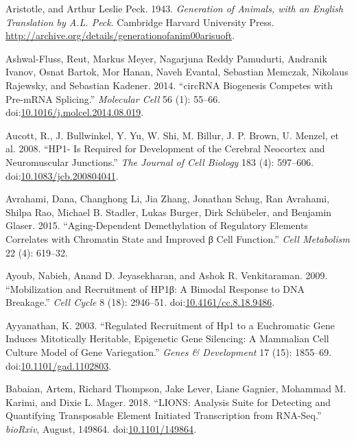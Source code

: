 \documentclass[onehalf,12pt]{beavtex}
\begin{document}
  \hypertarget{ref-AristotleGenerationanimalsEnglish1943}{}
  Aristotle, and Arthur Leslie Peck. 1943. \emph{Generation of Animals,
  with an English Translation by A.L. Peck}. Cambridge Harvard University
  Press. \url{http://archive.org/details/generationofanim00arisuoft}.
  
  \hypertarget{ref-Ashwal-FlusscircRNABiogenesisCompetes2014}{}
  Ashwal-Fluss, Reut, Markus Meyer, Nagarjuna Reddy Pamudurti, Andranik
  Ivanov, Osnat Bartok, Mor Hanan, Naveh Evantal, Sebastian Memczak,
  Nikolaus Rajewsky, and Sebastian Kadener. 2014. ``circRNA Biogenesis
  Competes with Pre-mRNA Splicing.'' \emph{Molecular Cell} 56 (1): 55--66.
  doi:\href{https://doi.org/10.1016/j.molcel.2014.08.019}{10.1016/j.molcel.2014.08.019}.
  
  \hypertarget{ref-AucottHP1requireddevelopment2008}{}
  Aucott, R., J. Bullwinkel, Y. Yu, W. Shi, M. Billur, J. P. Brown, U.
  Menzel, et al. 2008. ``HP1- Is Required for Development of the Cerebral
  Neocortex and Neuromuscular Junctions.'' \emph{The Journal of Cell
  Biology} 183 (4): 597--606.
  doi:\href{https://doi.org/10.1083/jcb.200804041}{10.1083/jcb.200804041}.
  
  \hypertarget{ref-AvrahamiAgingdependentdemethylationregulatory2015}{}
  Avrahami, Dana, Changhong Li, Jia Zhang, Jonathan Schug, Ran Avrahami,
  Shilpa Rao, Michael B. Stadler, Lukas Burger, Dirk Schübeler, and
  Benjamin Glaser. 2015. ``Aging-Dependent Demethylation of Regulatory
  Elements Correlates with Chromatin State and Improved β Cell Function.''
  \emph{Cell Metabolism} 22 (4): 619--32.
  
  \hypertarget{ref-AyoubMobilizationrecruitmentHP1v2009}{}
  Ayoub, Nabieh, Anand D. Jeyasekharan, and Ashok R. Venkitaraman. 2009.
  ``Mobilization and Recruitment of HP1β: A Bimodal Response to DNA
  Breakage.'' \emph{Cell Cycle} 8 (18): 2946--51.
  doi:\href{https://doi.org/10.4161/cc.8.18.9486}{10.4161/cc.8.18.9486}.
  
  \hypertarget{ref-AyyanathanRegulatedrecruitmentHP12003a}{}
  Ayyanathan, K. 2003. ``Regulated Recruitment of Hp1 to a Euchromatic
  Gene Induces Mitotically Heritable, Epigenetic Gene Silencing: A
  Mammalian Cell Culture Model of Gene Variegation.'' \emph{Genes \&
  Development} 17 (15): 1855--69.
  doi:\href{https://doi.org/10.1101/gad.1102803}{10.1101/gad.1102803}.
  
  \hypertarget{ref-BabaianLIONSAnalysisSuite2018}{}
  Babaian, Artem, Richard Thompson, Jake Lever, Liane Gagnier, Mohammad M.
  Karimi, and Dixie L. Mager. 2018. ``LIONS: Analysis Suite for Detecting
  and Quantifying Transposable Element Initiated Transcription from
  RNA-Seq.'' \emph{bioRxiv}, August, 149864.
  doi:\href{https://doi.org/10.1101/149864}{10.1101/149864}.
  
\end{document}
